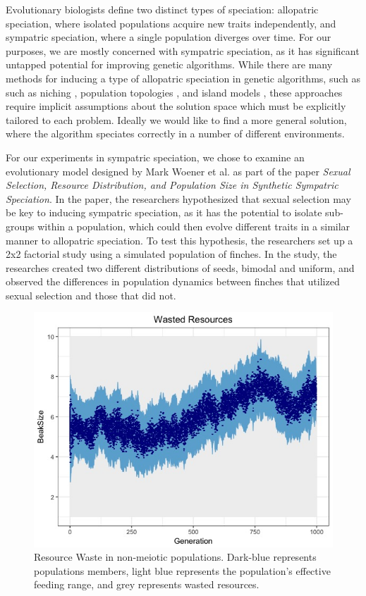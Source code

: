 \documentclass[conference]{IEEEtran}
\begin{document}
Evolutionary biologists define two distinct types of speciation: allopatric speciation, where isolated populations acquire new traits independently, and sympatric speciation, where a single population diverges over time. For our purposes, we are mostly concerned with sympatric speciation, as it has significant untapped potential for improving genetic algorithms. While there are many methods for inducing a type of allopatric speciation in genetic algorithms, such as such as niching \cite{NICHING}, population topologies \cite{TOPOLOGIES}, and island models \cite{ISLAND}, these approaches require implicit assumptions about the solution space which must be explicitly tailored to each problem. Ideally we would like to find a more general solution, where the algorithm speciates correctly in a number of different environments. 

For our experiments in sympatric speciation, we chose to examine an evolutionary model designed by Mark Woener et al. as part of the paper \textit{Sexual Selection, Resource Distribution, and Population Size in Synthetic Sympatric Speciation}. In the paper, the researchers hypothesized that sexual selection may be key to inducing sympatric speciation, as it has the potential to isolate sub-groups within a population, which could then evolve different traits in a similar manner to allopatric speciation. To test this hypothesis, the researchers set up a 2x2 factorial study using a simulated population of finches. In the study, the researches created two different distributions of seeds, bimodal and uniform, and observed the differences in population dynamics between finches that utilized sexual selection and those that did not.

\begin{figure}[t]
    \centering
    \includegraphics[width=\linewidth]{DATA_JPG/FrontPage}
    \caption{Resource Waste in non-meiotic populations. Dark-blue represents populations members, light blue represents the population's effective feeding range, and grey represents wasted resources.}
    \label{fig:FrontPage}
\end{figure}
\end{document}
